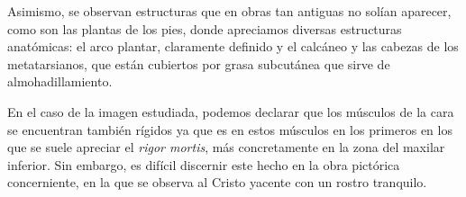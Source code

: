 Asimismo, se observan estructuras que en obras tan antiguas no solían aparecer, como son las plantas de los pies, donde apreciamos diversas estructuras anatómicas: el arco plantar, claramente definido y el calcáneo y las cabezas de los metatarsianos, que están cubiertos por grasa subcutánea que sirve de almohadillamiento.

 En el caso de la imagen estudiada, podemos declarar que los músculos de la cara se encuentran también rígidos ya que es en estos músculos en los primeros en los que se suele apreciar el \textit{rigor mortis}, más concretamente en la zona del maxilar inferior. Sin embargo, es difícil discernir este hecho en la obra pictórica concerniente, en la que se observa al Cristo yacente con un rostro tranquilo.
